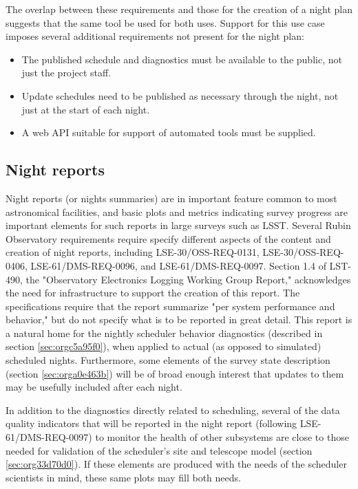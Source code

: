 The overlap between these requirements and those for the creation of a night plan suggests that the same tool be used for both uses. 
Support for this use case imposes several additional requirements not present for the night plan:
\begin{itemize}
\item The published schedule and diagnostics must be available to the public, not just the project staff.
\item Update schedules need to be published as necessary through the night, not just at the start of each night.
\item A web API suitable for support of automated tools must be supplied.
\end{itemize}

\subsection{Night reports}
\label{sec:orgbd6f80e}
Night reports (or nights summaries) are in important feature common to most astronomical facilities, and basic plots and metrics indicating survey progress are important elements for such reports in large surveys such as LSST.
Several Rubin Observatory requirements require specify different aspects of the content and creation of night reports, including LSE-30/OSS-REQ-0131, LSE-30/OSS-REQ-0406, LSE-61/DMS-REQ-0096, and LSE-61/DMS-REQ-0097. Section 1.4 of LST-490, the "Observatory Electronics Logging Working Group Report," acknowledges the need for infrastructure to support the creation of this report.
The specifications require that the report summarize "per system performance and behavior," but do not specify what is to be reported in great detail.
This report is a natural home for the nightly scheduler behavior diagnostics (described in section \ref{sec:orgc5a95f0}), when applied to actual (as opposed to simulated) scheduled nights.
Furthermore, some elements of the survey state description (section \ref{sec:orga0e463b}) will be of broad enough interest that updates to them may be usefully included after each night.

In addition to the diagnostics directly related to scheduling, several of the data quality indicators that will be reported in the night report (following LSE-61/DMS-REQ-0097) to monitor the health of other subsystems are close to those needed for validation of the scheduler's site and telescope model (section \ref{sec:org33d70d0}). If these elements are produced with the needs of the scheduler scientists in mind, these same plots may fill both needs.

